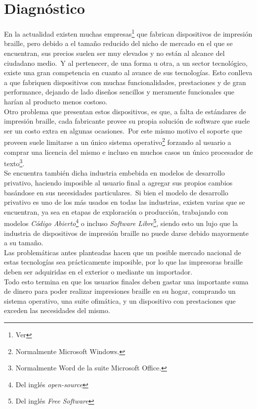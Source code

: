 \chapter{Diagn\'ostico}

En la actualidad existen muchas empresas\footnote{Ver } que
fabrican dispositivos de
impresi\'on braille, pero debido a el tama\~no reducido del nicho de mercado
en el que se encuentran, sus precios suelen ser muy elevados y no est\'an al
alcance del ciudadano medio.\ Y al pertenecer, de una forma u otra, a un sector
tecnol\'ogico, existe una gran competencia en cuanto al avance de sus
tecnolog\'ias. Esto conlleva a que fabriquen dispositivos con muchas
funcionalidades, prestaciones y de gran performance, dejando de lado dise\~nos
sencillos y meramente funcionales que har\'ian al producto menos costoso.\\

Otro problema que presentan estos dispositivos, es que, a falta de est\'andares
de impresi\'on braille, cada fabricante provee su propia soluci\'on de
software que suele ser un costo extra en algunas ocasiones.\ 
Por este mismo motivo el soporte que proveen suele limitarse a un \'unico
sistema operativo\footnote{Normalmente Microsoft Windows.} forzando al usuario
a comprar una licencia del mismo e incluso en muchos casos un \'unico
procesador de texto\footnote{Normalmente Word de la suite Microsoft Office.}.\\

Se encuentra tambi\'en dicha industria embebida en modelos de desarrollo
privativo, haciendo imposible al usuario final a agregar sus propios cambios
bas\'andose en sus necesidades particulares.\ Si bien el modelo de desarrollo
privativo es uno de los m\'as usados en todas las industrias, existen varias
que
se encuentran, ya sea en etapas de exploraci\'on o producci\'on, trabajando con
modelos \emph{C\'odigo Abierto}\footnote{Del ingl\'es \emph{open-source}} o
incluso \emph{Software Libre}\footnote{Del ingl\'es \emph{ Free Software}},
siendo esto un lujo que la industria de dispositivos de impresi\'on braille no
puede darse debido mayormente a su tama\~no.\\

Las problem\'aticas antes planteadas hacen que un posible mercado nacional de
estas tecnolog\'ias sea pr\'acticamente imposible, por lo que las impresoras
braille deben ser adquiridas en el exterior o mediante un importador.\\

Todo esto termina en que los usuarios finales deben gastar una importante suma
de dinero para poder realizar impresiones braille en su hogar, comprando un
sistema operativo, una suite ofim\'atica, y un dispositivo con prestaciones
que exceden las necesidades del mismo.
